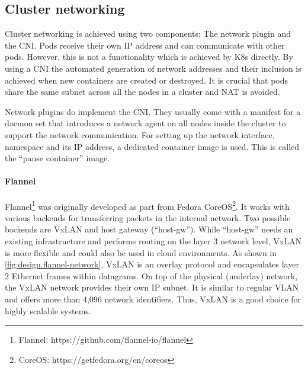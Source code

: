 \subsection{Cluster networking}
Cluster networking is achieved using two components: The network plugin and the \ac{CNI}. Pods receive their own \ac{IP} address and can communicate with other pods. However, this is not a functionality which is achieved by \ac{K8s} directly. By using a \ac{CNI} the automated generation of network addresses and their inclusion is achieved when new containers are created or destroyed. It is crucial that pods share the same subnet across all the nodes in a cluster and \ac{NAT} is avoided\cite{Luksa.2018}.

Network plugins do implement the \ac{CNI}. They usually come with a manifest for a daemon set that introduces a network agent on all nodes inside the cluster to support the network communication.
For setting up the network interface, namespace and its \ac{IP} address, a dedicated container image is used. This is called the \enquote{pause container} image.

\paragraph*{Flannel}
Flannel\footnote{Flannel: https://github.com/flannel-io/flannel} was originally developed as part from Fedora CoreOS\footnote{CoreOS: https://getfedora.org/en/coreos}\cite{SuseRancherCommunity.20230212}. It works with various backends for transferring packets in the internal network. Two possible backends are \ac{VxLAN} and host gateway (\enquote{host-gw}). While \enquote{host-gw} needs an existing infrastructure and performs routing on the layer 3 network level, \ac{VxLAN} is more flexible and could also be used in cloud environments\cite{GitHubFlannel.io.20230212}. As shown in \autoref{fig:design.flannel-network}, \ac{VxLAN} is an overlay protocol and encapsulates layer 2 Ethernet frames within datagrams\cite{SuseRancherCommunity.20230212}. On top of the physical (underlay) network, the \ac{VxLAN} network provides their own \ac{IP} subnet. It is similar to regular VLAN and offers more than 4,096 network identifiers\cite{SuseRancherCommunity.20230212}. Thus, \ac{VxLAN} is a good choice for highly scalable systems.

